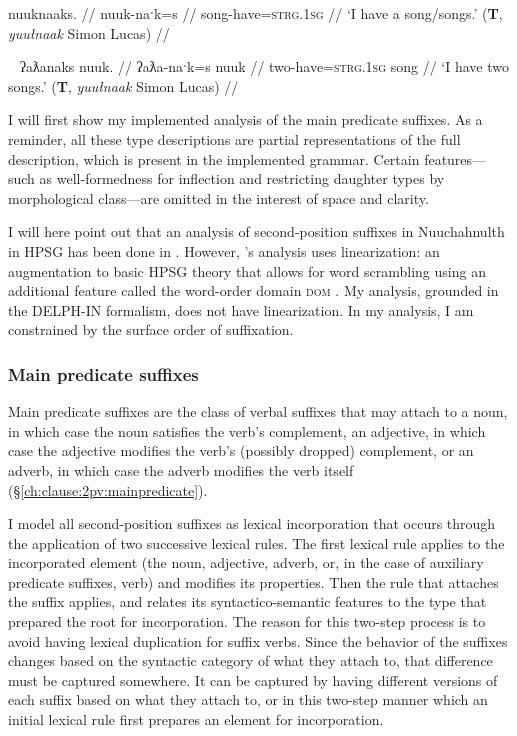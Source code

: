 \ex \label{ex:havesong2}
\begingl
\glpreamble nuuknaaks. //
\gla nuuk-naˑk=s //
\glb song-have=\textsc{strg.1sg} //
\glft `I have a song/songs.' (\textbf{T}, \textit{yuułnaak} Simon Lucas) //
\endgl
\xe

\ex~ \label{ex:havetwosongs2}
\begingl
\glpreamble ʔaƛanaks nuuk. //
\gla ʔaƛa-naˑk=s nuuk //
\glb two-have=\textsc{strg.1sg} song //
\glft `I have two songs.' (\textbf{T}, \textit{yuułnaak} Simon Lucas) //
\endgl
\xe


I will first show my implemented analysis of the main predicate suffixes. As a reminder, all these type descriptions are partial representations of the full description, which is present in the implemented grammar. Certain features---such as well-formedness for inflection and restricting daughter types by morphological class---are omitted in the interest of space and clarity.

I will here point out that an analysis of second-position suffixes in Nuuchahnulth in HPSG has been done in \citet{waldie2004}. However, \citeauthor{waldie2004}'s analysis uses linearization: an augmentation to basic HPSG theory that allows for word scrambling using an additional feature called the word-order domain \textsc{dom} \citep{reape1993}. My analysis, grounded in the DELPH-IN formalism, does not have linearization. In my analysis, I am constrained by the surface order of suffixation.

\subsubsection{Main predicate suffixes}

Main predicate suffixes are the class of verbal suffixes that may attach to a noun, in which case the noun satisfies the verb's complement, an adjective, in which case the adjective modifies the verb's (possibly dropped) complement, or an adverb, in which case the adverb modifies the verb itself (\S\ref{ch:clause:2pv:mainpredicate}).

I model all second-position suffixes as lexical incorporation that occurs through the application of two successive lexical rules. The first lexical rule applies to the incorporated element (the noun, adjective, adverb, or, in the case of auxiliary predicate suffixes, verb) and modifies its properties. Then the rule that attaches the suffix applies, and relates its syntactico-semantic features to the type that prepared the root for incorporation. The reason for this two-step process is to avoid having lexical duplication for suffix verbs. Since the behavior of the suffixes changes based on the syntactic category of what they attach to, that difference must be captured somewhere. It can be captured by having different versions of each suffix based on what they attach to, or in this two-step manner which an initial lexical rule first prepares an element for incorporation.

